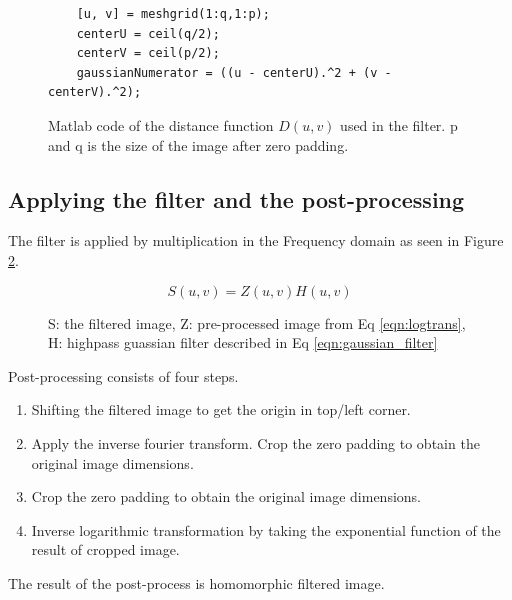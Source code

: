 \begin{figure}[h!]
  \begin{lstlisting}
    [u, v] = meshgrid(1:q,1:p);
    centerU = ceil(q/2);
    centerV = ceil(p/2);
    gaussianNumerator = ((u - centerU).^2 + (v - centerV).^2);
  \end{lstlisting}
  \label{code:raduv}
  \caption{Matlab code of the distance function $D(u,v)$ used in the filter. p and q is the size of the image after zero padding.}
\end{figure}

\subsection{Applying the filter and the post-processing}

The filter is applied by multiplication in the Frequency domain as seen in Figure \ref{fig:filteringOfImage}. 
\begin{figure}[h!]
  \begin{equation}
    S(u,v) = Z(u,v)H(u,v)
    \label{eqn:applyfilt}
  \end{equation}
  \caption{S: the filtered image, Z: pre-processed image from Eq \ref{eqn:logtrans}, H: highpass guassian filter described in Eq \ref{eqn:gaussian_filter} }
  \label{fig:filteringOfImage}    
\end{figure}

Post-processing consists of four steps.

\begin{enumerate}
  \item Shifting the filtered image to get the origin in top/left corner.
  \item Apply the inverse fourier transform. Crop the zero padding to obtain the original image dimensions.
  \item Crop the zero padding to obtain the original image dimensions.
  \item Inverse logarithmic transformation by taking the exponential function of the result of cropped image.
\end{enumerate}

The result of the post-process is homomorphic filtered image. 